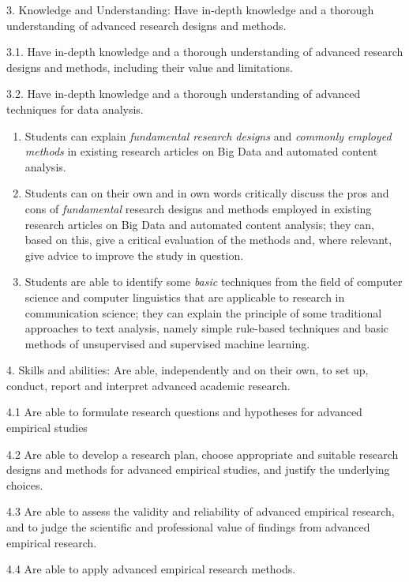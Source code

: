 
{\footnotesize{
3. Knowledge and Understanding: Have in-depth knowledge and a thorough understanding of advanced research designs and methods. 


3.1. Have in-depth knowledge and a thorough understanding of advanced research designs and methods, including their value and limitations.


3.2.	Have in-depth knowledge and a thorough understanding of advanced techniques for data analysis.

}}

\begin{enumerate}[A]
\item Students can explain \emph{fundamental research designs} and \emph{commonly employed methods} in existing research articles on Big Data and automated content analysis.
\item Students can on their own and in own words critically discuss the pros and cons of \emph{fundamental} research designs and methods employed in existing research articles on Big Data and automated content analysis; they can, based on this, give a critical evaluation of the methods and, where relevant, give advice to improve the study in question.
\item Students are able to identify some \emph{basic} techniques from the field of computer science and computer linguistics that are applicable to research in communication science; they can explain the principle of some traditional approaches to text analysis, namely simple rule-based techniques and basic methods of unsupervised and supervised machine learning. 
\end{enumerate}

{\footnotesize{
4.	Skills and abilities: Are able, independently and on their own, to set up, conduct, report and interpret advanced academic research.

4.1	Are able to formulate research questions and hypotheses for advanced empirical studies


4.2	Are able to develop a research plan, choose appropriate and suitable research designs and methods for advanced empirical studies, and justify the underlying choices. 


4.3	Are able to assess the validity and reliability of advanced empirical research, and to judge the scientific and professional value of findings from advanced empirical research.


4.4	Are able to apply advanced empirical research methods.

 }}

